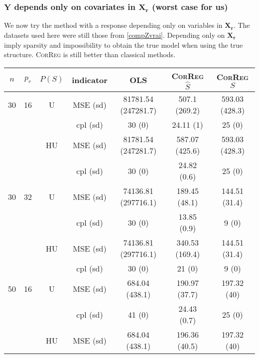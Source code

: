 \documentclass[11pt,a4paper]{article}
\begin{document}
\clearpage
	\subsubsection{$\boldsymbol{Y}$ depends only on covariates in $\boldsymbol{X_r}$ (worst case for us)}	 \label{tableMSEsimgauche}
We now try the method with a response depending only on variables in $\boldsymbol{X_r}$. The datasets used here were still those from \ref{compZvrai}.
Depending only on $\boldsymbol{X_r}$ imply sparsity and impossibility to obtain the true model when using the true structure. \textsc{CorReg} is still better than classical methods. 

\begin{table}[h!]
\centering
\begin{tabular}{|c|c|c|c|c|c|c|}
\hline 
$n$ & $p_r$&$P(S)$ &indicator &OLS  &    \textsc{CorReg} $\hat S$& \textsc{CorReg} $S$\\ 
\hline %
30 & 16 & U&MSE (sd) & 81781.54 (247281.7) & 507.1 (269.2) & 593.03 (428.3) \\
& & & cpl (sd) & 30 (0) & 24.11 (1) & 25 (0) \\
 &  &HU &MSE (sd) & 81781.54 (247281.7) & 587.07 (425.6) & 593.03 (428.3) \\
& & & cpl (sd) & 30 (0) & 24.82 (0.6) & 25 (0) \\
\hline %
30 & 32 & U & MSE (sd) & 74136.81 (297716.1) & 189.45 (48.1) & 144.51 (31.4) \\
& & & cpl (sd) & 30 (0) & 13.85 (0.9) & 9 (0) \\
 &  & HU & MSE (sd) & 74136.81 (297716.1) & 340.53 (169.4) & 144.51 (31.4) \\
& & & cpl (sd) & 30 (0) & 21 (0) & 9 (0) \\
\hline
\hline %
50 & 16 & U&	MSE (sd) & 684.04 (438.1) & 190.97 (37.7) & 197.32 (40) \\
& & & cpl (sd) & 41 (0) & 24.43 (0.7) & 25 (0) \\
 &  &HU &MSE (sd) & 684.04 (438.1) & 196.36 (40.5) & 197.32 (40) \\

\end{tabular}
\end{table}
\end{document}
